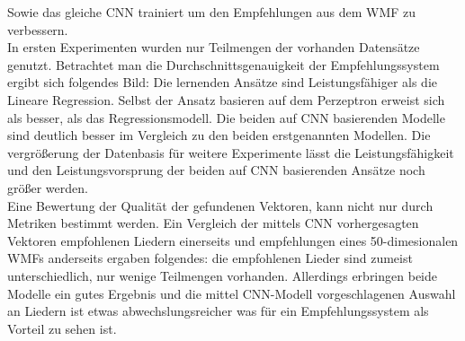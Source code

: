 \documentclass[twosided,a4,10pt]{article}
\begin{document}
\begin{multicols}{2}
		Sowie das gleiche CNN trainiert um den Empfehlungen aus dem WMF zu verbessern. \cite{oord}\newline\\
		In ersten Experimenten wurden nur Teilmengen der vorhanden Datensätze genutzt. Betrachtet man die Durchschnittsgenauigkeit der Empfehlungssystem ergibt sich folgendes Bild:  Die lernenden Ansätze sind Leistungsfähiger als die Lineare Regression. Selbst der Ansatz basieren auf dem Perzeptron erweist sich als besser, als das Regressionsmodell. Die beiden auf CNN basierenden Modelle sind deutlich besser im Vergleich zu den beiden erstgenannten Modellen. Die vergrößerung der Datenbasis für weitere Experimente lässt die Leistungsfähigkeit und den Leistungsvorsprung der beiden auf CNN basierenden Ansätze noch größer werden. \cite{oord}\newline\\
		Eine Bewertung der Qualität der gefundenen Vektoren, kann nicht nur durch Metriken bestimmt werden. Ein Vergleich der mittels CNN vorhergesagten Vektoren empfohlenen Liedern einerseits und empfehlungen eines 50-dimesionalen WMFs anderseits ergaben folgendes: die empfohlenen Lieder sind zumeist unterschiedlich, nur wenige Teilmengen vorhanden. Allerdings erbringen beide Modelle ein gutes Ergebnis und die mittel CNN-Modell vorgeschlagenen Auswahl an Liedern ist etwas abwechslungsreicher was für ein Empfehlungssystem als Vorteil zu sehen ist. \cite{oord}
		

\end{multicols}
\end{document}

